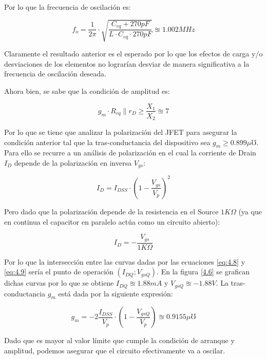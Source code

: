 \newpage
Por lo que la frecuencia de oscilación es: 

\begin{equation}
\label{eq:4.6}
f_o = \frac{1}{2\pi} \cdot \sqrt{\frac{C_{eq} + 270 pF}{L\cdot C_{eq} \cdot 270pF}} \approxeq 1.002 MHz
\end{equation}

Claramente el resultado anterior es el esperado por lo que los efectos de carga y/o desviaciones de los elementos no lograrían desviar de manera significativa a la frecuencia de oscilación deseada. 

Ahora bien, se sabe que la condición de amplitud es: 

\begin{equation}
\label{eq:4.7}
g_m \cdot R_{eq}\parallel r_D \geq \frac{X_1}{X_2} \approxeq 7
\end{equation}

Por lo que se tiene que analizar la polarización del JFET para asegurar la condición anterior tal que  la tras-conductancia del dispositivo sea $g_m \geq 0.899 \mu \mho$. Para ello se recurre a un análisis de polarización en el cual la corriente de Drain $I_D$ depende de la polarización en inversa $V_{gs}$:

\begin{equation}
\label{eq:4.8}
I_D = I_{DSS}\cdot (1-\frac{V_{gs}}{V_p})^2
\end{equation}

Pero dado que la polarización depende de la resistencia en el Source $1K\Omega$ (ya que en continua el capacitor en paralelo actúa como un circuito abierto): 

\begin{equation}
\label{eq:4.9}
I_D = - \frac{V_{gs}}{1K\Omega}
\end{equation}

Por lo que la intersección entre las curvas dadas por las ecuaciones \ref{eq:4.8} y \ref{eq:4.9} sería el punto de operación $(I_{DQ};V_{gsQ})$. En la figura \ref{4.6} se grafican dichas curvas por lo que se obtiene $I_{DQ}\approxeq1.88mA$ y $V_{gsQ}\approxeq-1.88V$. La tras-conductancia $g_m$ está dada por la siguiente expresión:

\begin{equation}
\label{eq:4.91}
g_m= -2\frac{I_{DSS}}{V_p}\cdot (1-\frac{V_{gsQ}}{V_p}) \approxeq 0.9155 \mu \mho
\end{equation}

Dado que es mayor al valor límite que cumple la condición de arranque y amplitud, podemos asegurar que el circuito efectivamente va a oscilar.


